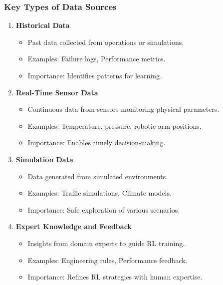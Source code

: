 \documentclass[aspectratio=169]{beamer}
\begin{document}
\begin{frame}[fragile]
    \frametitle{Key Types of Data Sources}
    \begin{enumerate}
        \item \textbf{Historical Data}
            \begin{itemize}
                \item Past data collected from operations or simulations.
                \item Examples: Failure logs, Performance metrics.
                \item Importance: Identifies patterns for learning.
            \end{itemize}
        
        \item \textbf{Real-Time Sensor Data}
            \begin{itemize}
                \item Continuous data from sensors monitoring physical parameters.
                \item Examples: Temperature, pressure, robotic arm positions.
                \item Importance: Enables timely decision-making.
            \end{itemize}
        
        \item \textbf{Simulation Data}
            \begin{itemize}
                \item Data generated from simulated environments.
                \item Examples: Traffic simulations, Climate models.
                \item Importance: Safe exploration of various scenarios.
            \end{itemize}
        
        \item \textbf{Expert Knowledge and Feedback}
            \begin{itemize}
                \item Insights from domain experts to guide RL training.
                \item Examples: Engineering rules, Performance feedback.
                \item Importance: Refines RL strategies with human expertise.
            \end{itemize}
    \end{enumerate}
\end{frame}
\end{document}
